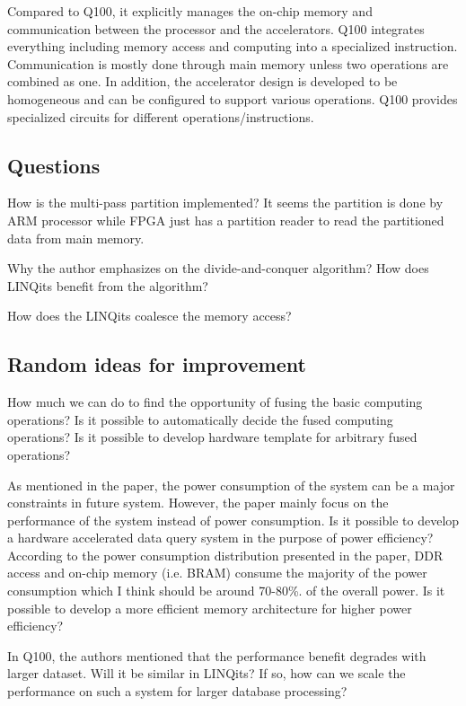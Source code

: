 Compared to Q100, it explicitly manages the on-chip memory and communication between the processor
and the accelerators. Q100 integrates everything including memory access and computing into a
specialized instruction. Communication is mostly done through main memory unless two operations
are combined as one. In addition, the accelerator design is developed to be homogeneous and can be
configured to support various operations. Q100 provides specialized circuits for different
operations/instructions.

\subsection{Questions}
How is the multi-pass partition implemented? 
It seems the partition is done by ARM processor while FPGA just has a partition reader to 
read the partitioned data from main memory.

Why the author emphasizes on the divide-and-conquer algorithm? How does LINQits benefit from the
algorithm?

How does the LINQits coalesce the memory access? 

\subsection{Random ideas for improvement}
How much we can do to find the opportunity of fusing the basic computing operations? 
Is it possible to automatically decide the fused computing operations? Is it possible to develop
hardware template for arbitrary fused operations?

As mentioned in the paper, the power consumption of the system can be a major constraints in future
system. However, the paper mainly focus on the performance of the system instead of power
consumption. Is it possible to develop a hardware accelerated data query system in the purpose of
power efficiency? According to the power consumption
distribution presented in the paper, DDR access and on-chip memory (i.e. BRAM) consume the majority of
the power consumption which I think should be around 70-80\%. of the overall power. Is it possible
to develop a more efficient memory architecture for higher power efficiency?  

In Q100, the authors mentioned that the performance benefit degrades with larger dataset. Will it be
similar in LINQits? If so, how can we scale the performance on such a system for larger database
processing?  

